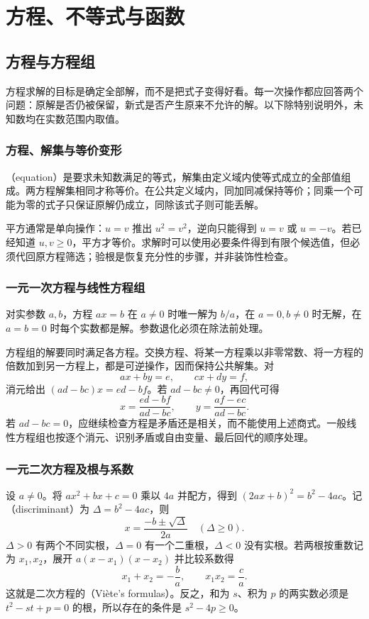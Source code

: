 \documentclass[UTF8]{ctexbook}
\begin{document}
\part{方程、不等式与函数}

\chapter{方程与方程组}
\label{chap:em-equations}
方程求解的目标是确定全部解，而不是把式子变得好看。每一次操作都应回答两个问题：原解是否仍被保留，新式是否产生原来不允许的解。以下除特别说明外，未知数均在实数范围内取值。

\section{方程、解集与等价变形}
（equation）是要求未知数满足的等式，解集由定义域内使等式成立的全部值组成。两方程解集相同才称等价。在公共定义域内，同加同减保持等价；同乘一个可能为零的式子只保证原解仍成立，同除该式子则可能丢解。

平方通常是单向操作：$u=v$ 推出 $u^2=v^2$，逆向只能得到 $u=v$ 或 $u=-v$。若已经知道 $u,v\ge0$，平方才等价。求解时可以使用必要条件得到有限个候选值，但必须代回原方程筛选；验根是恢复充分性的步骤，并非装饰性检查。

\section{一元一次方程与线性方程组}
对实参数 $a,b$，方程 $ax=b$ 在 $a\ne0$ 时唯一解为 $b/a$，在 $a=0,b\ne0$ 时无解，在 $a=b=0$ 时每个实数都是解。参数退化必须在除法前处理。

方程组的解要同时满足各方程。交换方程、将某一方程乘以非零常数、将一方程的倍数加到另一方程上，都是可逆操作，因而保持公共解集。对
\[
 ax+by=e,\qquad cx+dy=f,
\]
消元给出 $(ad-bc)x=ed-bf$。若 $ad-bc\ne0$，再回代可得
\[
 x=\frac{ed-bf}{ad-bc},\qquad y=\frac{af-ec}{ad-bc}.
\]
若 $ad-bc=0$，应继续检查方程是矛盾还是相关，而不能使用上述商式。一般线性方程组也按逐个消元、识别矛盾或自由变量、最后回代的顺序处理。

\section{一元二次方程及根与系数}
设 $a\ne0$。将 $ax^2+bx+c=0$ 乘以 $4a$ 并配方，得到 $(2ax+b)^2=b^2-4ac$。记（discriminant）为 $\Delta=b^2-4ac$，则
\begin{equation}\label{eq:em-quadratic}
 x=\frac{-b\pm\sqrt\Delta}{2a}\quad(\Delta\ge0).
\end{equation}
$\Delta>0$ 有两个不同实根，$\Delta=0$ 有一个二重根，$\Delta<0$ 没有实根。若两根按重数记为 $x_1,x_2$，展开 $a(x-x_1)(x-x_2)$ 并比较系数得
\[
 x_1+x_2=-\frac ba,\qquad x_1x_2=\frac ca.
\]
这就是二次方程的（Viète's formulas）。反之，和为 $s$、积为 $p$ 的两实数必须是 $t^2-st+p=0$ 的根，所以存在的条件是 $s^2-4p\ge0$。
\end{document}
